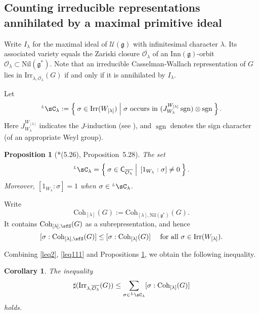 \documentclass[12pt,a4paper]{amsart}
\newcommand{\CO}{{\mathcal {O}}}
\newcommand{\sgn}{\operatorname{sgn}}
\newcommand{\g}{\mathfrak g}
\numberwithin{equation}{section}
\newtheorem{prop}[thm]{Proposition}
\newtheorem{cor}[thm]{Corollary}
\theoremstyle{remark}
\def\Irr{\mathrm{Irr}}
\def\LC{{}^{\scriptscriptstyle L}\sC}
\def\Coh{\mathrm{Coh}}
\newcommand{\Lam}{{[\lambda]}}
\begin{document}
\subsection{Counting irreducible representations annihilated by a maximal primitive ideal}\label{sec13}
Write $I_\lambda$ for the maximal ideal of $\mathcal U(\g)$ with infinitesimal
character $\lambda$. Its associated variety equals the Zariski closure
$\overline{\CO_\lambda}$ of an $\mathrm{Inn}(\g)$-orbit
$\CO_\lambda\subset\mathrm{Nil}(\g^*) $. Note that an irreducible
Casselman-Wallach representation of $G$ lies in
$\Irr_{\lambda,\overline{\CO_\lambda}}(G)$ if and only if it is annihilated by
$I_\lambda$.


Let
\[
  \LC_{\lambda}:= \Set{\sigma\in \Irr(W_\Lam) | \sigma \text{ occurs in $(J_{W_{\lambda}}^{W_{\Lam}} \sgn )\otimes \sgn$}}.
\]
Here $J_{W_{\lambda}}^{W_{\Lam}} $ indicates the $J$-induction (see \cite[Chapter 12]{Carter}), and $\sgn$
denotes the sign character (of an appropriate Weyl group).




 \begin{prop}[{\cite{BVUni}*{(5.26), Proposition~5.28}}]\label{lem:lcell.BV0}
  The set
   \[
     \LC_{\lambda} = \Set{\sigma\in \mathsf C_{\overline{\CO_\lambda}} |\,   [1_{W_{\lambda}}:\sigma]\neq 0}.
   \]
   Moreover, $[1_{W_{\lambda}}:\sigma]=1$ when
   $\sigma\in \LC_\lambda$.
 \end{prop}

Write
\[
  \Coh_{\Lam}(G):= \Coh_{\Lam,\mathrm{Nil}(\g^*)}(G).
\]
It contains $ \Coh_{\Lam,\sfS}(G)$ as a subrepresentation, and hence
\begin{equation}\label{leq111}
  [\sigma: \Coh_{\Lam,\sfS}(G)]\leq [\sigma: \Coh_{\Lam}(G)]\quad \textrm{ for all $\sigma\in \Irr(W_\Lam)$.}
\end{equation}

 Combining \eqref{leq2}, \eqref{leq111} and  Propositions \ref{lem:lcell.BV0}, we obtain the following inequality.

 \begin{cor}
   \label{cor:bound}
   The inequality
   \begin{equation}\label{boundc}
     \sharp(\Irr_{\lambda,\overline{\CO_\lambda}}(G)) \leq \sum_{\sigma\in \LC_\lambda} [\sigma: \Coh_{\Lam}(G)]
   \end{equation}
   holds.
 \end{cor}
\end{document}
